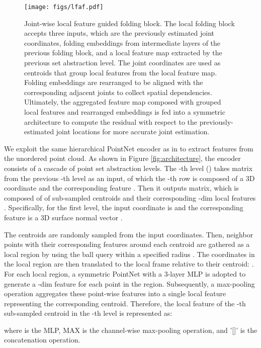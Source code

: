 \documentclass[10pt,twocolumn,letterpaper]{article}
\begin{document}
\begin{figure*}
\centering
\texttt{[image: figs/lfaf.pdf]}
\caption{Joint-wise local feature guided folding block. The local folding block accepts three inputs, which are the previously estimated joint coordinates, folding embeddings from intermediate layers of the previous folding block, and a local feature map extracted by the previous set abstraction level. The joint coordinates are used as centroids that group local features from the local feature map. Folding embeddings are rearranged to be aligned with the corresponding adjacent joints to collect spatial dependencies. Ultimately, the aggregated feature map composed with grouped local features and rearranged embeddings is fed into a symmetric architecture to compute the residual with respect to the previously-estimated joint locations for more accurate joint estimation.}
\label{fig:lsfaf}
\end{figure*}

We exploit the same hierarchical PointNet encoder as in \cite{ge2018hand, ge2018point} to extract features from the unordered point cloud. 
As shown in Figure \ref{fig:architecture}, the encoder consists of a cascade of  point set abstraction levels. 
The -th level () takes  matrix from the previous -th level as an input, of which the -th row is composed of a 3D coordinate  and the corresponding feature . 
Then it outputs  matrix, 
which is composed of  of sub-sampled centroids  and their corresponding -dim local features .
Specifically, for the first level, the input coordinate is  and the corresponding feature is a 3D surface normal vector . 

The  centroids are randomly sampled from the input coordinates. Then,  neighbor points with their corresponding features around each centroid  are gathered as a local region  by using the ball query \cite{qi2017pointnet++} within a specified radius . The coordinates in the local region are then translated to the local frame relative to their centroid: .
For each local region, a symmetric PointNet \cite{qi2017pointnet} with a 3-layer MLP is adopted to generate a -dim feature for each point in the region. Subsequently, a max-pooling operation aggregates these point-wise features into a single local feature representing the corresponding centroid. Therefore, the local feature of the -th sub-sampled centroid in the -th level is represented as:

where  is the MLP, MAX is the channel-wise max-pooling operation, and '[]' is the concatenation operation.
\end{document}
